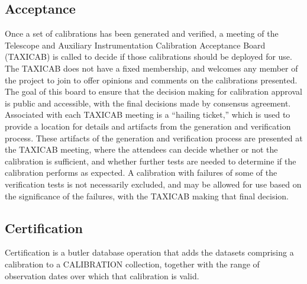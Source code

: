 
\subsection{Acceptance} \label{sec:verify-accept-certify:acceptance}

Once a set of calibrations has been generated and verified, a meeting of the Telescope and Auxiliary Instrumentation Calibration Acceptance Board (TAXICAB) is called to decide if those calibrations should be deployed for use.
The TAXICAB does not have a fixed membership, and welcomes any member of the project to join to offer opinions and comments on the calibrations presented.
The goal of this board to ensure that the decision making for calibration approval is public and accessible, with the final decisions made by consensus agreement.
Associated with each TAXICAB meeting is a ``hailing ticket,'' which is used to provide a location for details and artifacts from the generation and verification process.
These artifacts of the generation and verification process are presented at the TAXICAB meeting, where the attendees can decide whether or not the calibration is sufficient, and whether further tests are needed to determine if the calibration performs as expected.
A calibration with failures of some of the verification tests is not necessarily excluded, and may be allowed for use based on the significance of the failures, with the TAXICAB making that final decision.


\subsection{Certification} \label{sec:verify-accept-certify:certification}

Certification is a butler database operation that adds the datasets comprising a calibration to a CALIBRATION collection, together with the range of observation dates over which that calibration is valid.

